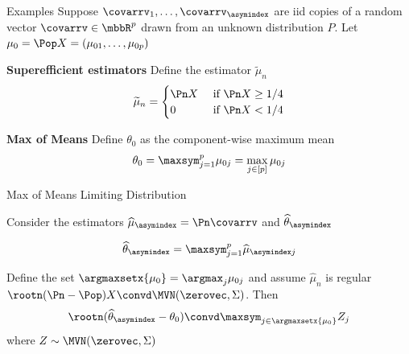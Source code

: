 \documentclass[aspectratio=169, professionalfonts]{beamer}
\begin{document}
\begin{frame}{Examples}
Suppose $\covarrv_1, \ldots, \covarrv_{\asymindex}$ are iid copies of a random vector
$\covarrv \in \mbbR^{p}$ drawn from an unknown distribution $P$. Let $\mu_0 = \Pop X
= (\mu_{01}, \ldots, \mu_{0p})$

\vfill \pause

  \textbf{Superefficient estimators}
Define the estimator $\widetilde{\mu}_n$
  \begin{displaymath}
    \widetilde{\mu}_n = \begin{cases} \Pn X & \text { if } \Pn X \geq 1/4 \\
    0 & \text { if } \Pn X < 1/4 \end{cases}
    \end{displaymath}

  \vfill \pause

\textbf{Max of Means}
Define $\theta_0$ as the component-wise maximum mean
\begin{displaymath}
\theta_0 = \maxsym_{j = 1}^p \mu_{0j} = \max_{j \in [p]} \mu_{0j}
    \end{displaymath}
    \end{frame}

  \begin{frame}{Max of Means Limiting Distribution}

Consider the estimators $\widehat{\mu}_{\asymindex} = \Pn \covarrv$  and $\widehat{\theta}_{\asymindex}$

$$\widehat{\theta}_{\asymindex} = \maxsym_{j = 1}^p \widehat{\mu}_{\asymindex j}$$

\begin{lemma}
      Define the set $\argmaxsetx{\mu_{0}} = \argmax_j \mu_{0j}$ and assume
$\widehat{\mu}_n$ is regular $\rootn (\Pn - \Pop)X \convd \MVN(\zerovec, \Sigma)$. Then
\begin{displaymath}
\rootn (\widehat{\theta}_{\asymindex} - \theta_0) \convd \maxsym_{j \in \argmaxsetx{\mu_0}} Z_j
    \end{displaymath}
where $Z \sim \MVN(\zerovec, \Sigma)$
\end{lemma}

    \end{frame}
\end{document}
